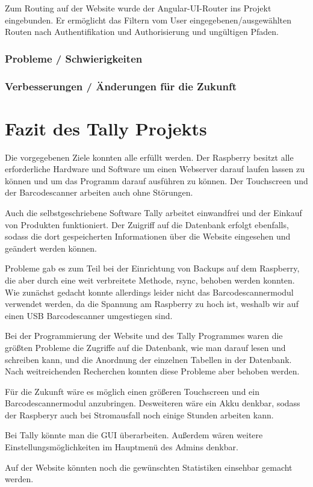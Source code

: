 \documentclass[11pt,a4paper]{article} %
\begin{document}
Zum Routing auf der Website wurde der Angular-UI-Router ins Projekt eingebunden. Er ermöglicht das Filtern vom User eingegebenen/ausgewählten Routen nach Authentifikation und Authorisierung und ungültigen Pfaden. 


\subsubsection{Probleme / Schwierigkeiten}

\subsubsection{Verbesserungen / Änderungen für die Zukunft}
		
		
\section{Fazit des Tally Projekts}
Die vorgegebenen Ziele konnten alle erfüllt werden. Der Raspberry besitzt alle erforderliche Hardware und Software um einen Webserver darauf laufen lassen zu können und um das Programm darauf ausführen zu können. Der Touchscreen und der Barcodescanner arbeiten auch ohne Störungen.
\par 
Auch die selbstgeschriebene Software Tally arbeitet einwandfrei und der Einkauf von Produkten funktioniert. Der Zuigriff auf die Datenbank erfolgt ebenfalls, sodass die dort gespeicherten Informationen über die Website eingesehen und geändert werden können.
\par
Probleme gab es zum Teil bei der Einrichtung von Backups auf dem Raspberry, die aber durch eine weit verbreitete Methode, rsync, behoben werden konnten. Wie zunächst gedacht konnte allerdings leider nicht das Barcodescannermodul verwendet werden, da die Spannung am Raspberry zu hoch ist, weshalb wir auf einen USB Barcodescanner umgestiegen sind.
\par
Bei der Programmierung der Website und des Tally Programmes waren die größten Probleme die Zugriffe auf die Datenbank, wie man darauf lesen und schreiben kann, und die Anordnung der einzelnen Tabellen in der Datenbank. Nach weitreichenden Recherchen konnten diese Probleme aber behoben werden.
\par
Für die Zukunft wäre es möglich einen größeren Touchscreen und ein Barcodescannermodul anzubringen. Desweiteren wäre ein Akku denkbar, sodass der Raspberyr auch bei Stromausfall noch einige Stunden arbeiten kann.
\par
Bei Tally könnte man die GUI überarbeiten. Außerdem wären weitere Einstellungsmöglichkeiten im Hauptmenü des Admins denkbar. 
\par
Auf der Website könnten noch die gewünschten Statistiken einsehbar gemacht werden.	



\newpage
\newpage
\begin{center}


\end{center}
\end{document}
